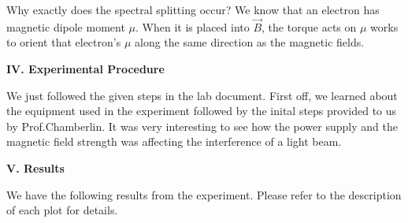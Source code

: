 \documentclass[fleqn]{article}
\begin{document}
  Why exactly does the spectral splitting occur? We know that an electron has magnetic dipole moment $\mu$. When it is placed into 
  $\overrightarrow{B}$, the torque acts on $\mu$ works to orient that electron's $\mu$ along the same direction as the magnetic fields.


  \vspace{20px}

  \textbf{IV. Experimental Procedure}

  \vspace{10px}

  We just followed the given steps in the
  lab document. First off, we learned about the equipment used in the experiment followed by the inital steps provided to us by 
  Prof.Chamberlin. It was very interesting to see how the power supply and the magnetic field strength was affecting the interference 
  of a light beam. \textcite{Five}

  \vspace{20px}

  \textbf{V. Results}

  \vspace{10px}

  We have the following results from the experiment. Please refer to the description of each plot for details.

  \vspace{20px}
\end{document}
